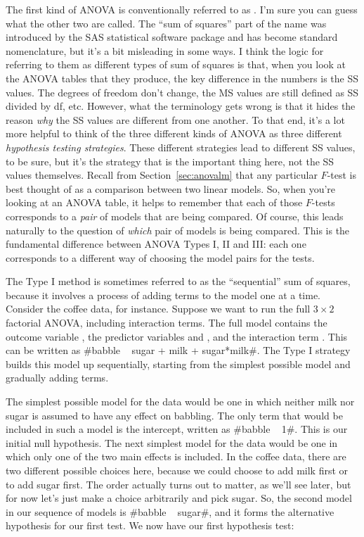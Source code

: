 The first kind of ANOVA is conventionally referred to as . I'm sure you can guess what the other two are called. The ``sum of squares'' part of the name was introduced by the SAS statistical software package and has become standard nomenclature, but it's a bit misleading in some ways. I think the logic for referring to them as different types of sum of squares is that, when you look at the ANOVA tables that they produce, the key difference in the numbers is the SS values. The degrees of freedom don't change, the MS values are still defined as SS divided by df, etc. However, what the terminology gets wrong is that it hides the reason {\it why} the SS values are different from one another. To that end, it's a lot more helpful to think of the three different kinds of ANOVA as three different {\it hypothesis testing strategies}. These different strategies lead to different SS values, to be sure, but it's the strategy that is the important thing here, not the SS values themselves. Recall from Section~\ref{sec:anovalm} that any particular $F$-test is best thought of as a comparison between two linear models. So, when you're looking at an ANOVA table, it helps to remember that each of those $F$-tests corresponds to a {\it pair} of models that are being compared. Of course, this leads naturally to the question of {\it which} pair of models is being compared. This is the fundamental difference between ANOVA Types I, II and III: each one corresponds to a different way of choosing the model pairs for the tests. 


The Type I method is sometimes referred to as the ``sequential'' sum of squares, because it involves a process of adding terms to the model one at a time. Consider the coffee data, for instance. Suppose we want to run the full $3 \times 2$ factorial ANOVA, including interaction terms. The full model contains the outcome variable , the predictor variables  and , and the interaction term . This can be written as \rtextverb#babble ~ sugar + milk + sugar*milk#. The Type I strategy builds this model up sequentially, starting from the simplest possible model and gradually adding terms. 

The simplest possible model for the data would be one in which neither milk nor sugar is assumed to have any effect on babbling. The only term that would be included in such a model is the intercept, written as \rtextverb#babble ~ 1#. This is our initial null hypothesis. The next simplest model for the data would be one in which only one of the two main effects is included. In the coffee data, there are two different possible choices here, because we could choose to add milk first or to add sugar first. The order actually turns out to matter, as we'll see later, but for now let's just make a choice arbitrarily and pick sugar. So, the second model in our sequence of models is \rtextverb#babble ~ sugar#, and it forms the alternative hypothesis for our first test. We now have our first hypothesis test:

